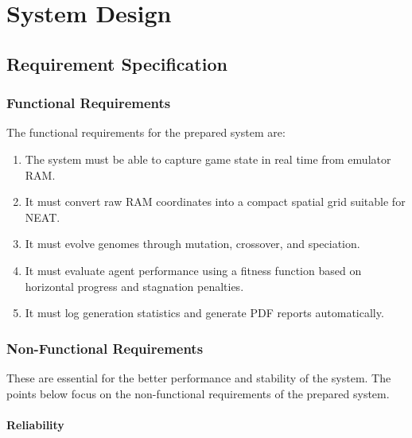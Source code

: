 \chapter{System Design}
\label{ch:system-design}

\section{Requirement Specification}
\label{sec:requirement-specification}

\subsection{Functional Requirements}
\label{subsec:functional-requirements}

The functional requirements for the prepared system are:

\begin{enumerate}
    \item The system must be able to capture game state in real time from
    emulator RAM.

    \item It must convert raw RAM coordinates into a compact spatial grid
    suitable for NEAT.

    \item It must evolve genomes through mutation, crossover, and speciation.

    \item It must evaluate agent performance using a fitness function based on
    horizontal progress and stagnation penalties.

    \item It must log generation statistics and generate PDF reports
    automatically.
\end{enumerate}


\subsection{Non-Functional Requirements}
\label{subsec:non-functional-requirements}

These are essential for the better performance and stability of the system. The
points below focus on the non-functional requirements of the prepared system.

\subsubsection{Reliability}

